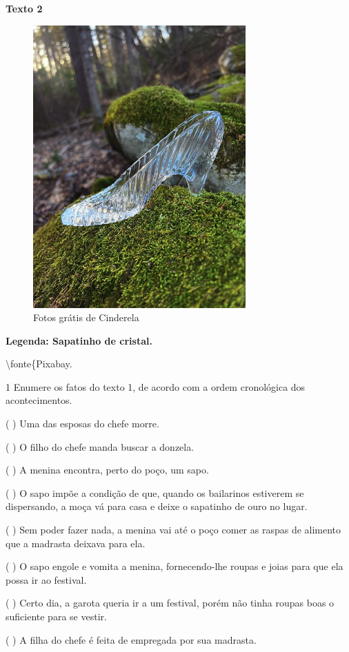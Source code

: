 \textbf{Texto 2}

\begin{figure}
\centering
\includegraphics[width=3.20455in,height=4.27009in]{./imgSAEB_6_POR/media/image9.jpeg}
\caption{Fotos grátis de Cinderela}
\end{figure}

\textbf{Legenda: Sapatinho de cristal.}

\textbackslash fonte\{Pixabay.

\num{1} Enumere os fatos do texto 1, de acordo com a ordem cronológica
dos acontecimentos.

( ) Uma das esposas do chefe morre.

( ) O filho do chefe manda buscar a donzela.

( ) A menina encontra, perto do poço, um sapo.

( ) O sapo impõe a condição de que, quando os bailarinos estiverem se
dispersando, a moça vá para casa e deixe o sapatinho de ouro no lugar.

( ) Sem poder fazer nada, a menina vai até o poço comer as raspas de
alimento que a madrasta deixava para ela.

( ) O sapo engole e vomita a menina, fornecendo-lhe roupas e joias para
que ela possa ir ao festival.

( ) Certo dia, a garota queria ir a um festival, porém não tinha roupas
boas o suficiente para se vestir.

( ) A filha do chefe é feita de empregada por sua madrasta.

